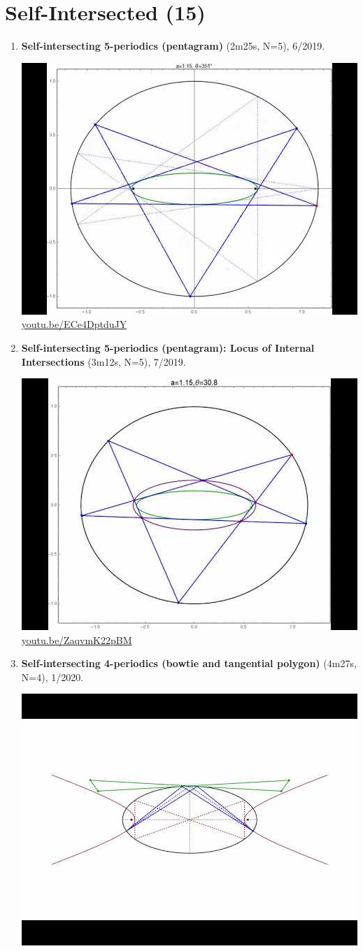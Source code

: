 \documentclass[12pt]{amsart}
\begin{document}
\section{Self-Intersected (15)}

\begin{enumerate}[resume]
\item \textbf{Self-intersecting 5-periodics (pentagram)} (2m25s, N=5), 6/2019. 
\begin{center}\includegraphics[width=.5\textwidth]{pics/ECe4DptduJY.jpg} \\ 
\href{https://youtu.be/ECe4DptduJY}{\url{youtu.be/ECe4DptduJY}}\end{center}
% 
\item \textbf{Self-intersecting 5-periodics (pentagram): Locus of Internal Intersections} (3m12s, N=5), 7/2019. 
\begin{center}\includegraphics[width=.5\textwidth]{pics/ZaqvmK22pBM.jpg} \\ 
\href{https://youtu.be/ZaqvmK22pBM}{\url{youtu.be/ZaqvmK22pBM}}\end{center}
% 
\item \textbf{Self-intersecting 4-periodics (bowtie and tangential polygon)} (4m27s, N=4), 1/2020. 
\begin{center}\includegraphics[width=.5\textwidth]{pics/C8W2e6ftfOw.jpg} \\ 

\end{center}
\end{enumerate}
\end{document}
